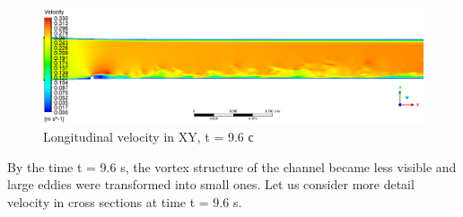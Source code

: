 	\begin{figure}[H]
		\centering
		\includegraphics[width=1\linewidth]{../Assets/T96_Velocity_ContourXY}
		\caption{Longitudinal velocity in XY, t = 9.6 с}
		\label{fig:t96velocitycontourxy}
	\end{figure}
	By the time t = 9.6 s, the vortex structure of the channel became less visible and large eddies were transformed into small ones.
	Let us consider more detail velocity in cross sections at time t = 9.6 s.
